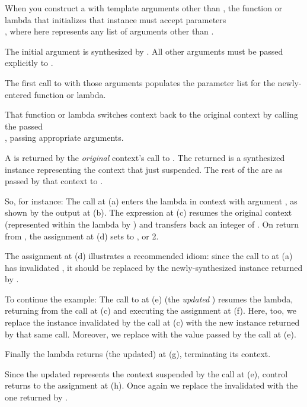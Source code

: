When you construct a \ectx with template arguments other than , the
function or lambda that initializes that instance must accept parameters\\
, where  here
represents any list of arguments other than .

The initial \ectx argument is synthesized by \op. All other arguments must be
passed explicitly to \op.

The first call to \op with those arguments populates the parameter list for
the newly-entered function or lambda.

That function or lambda switches context back to the original context by
calling the passed\\
\ectxop, passing appropriate arguments.

A  is returned by
the \emph{original} context's call to \op. The returned \ectx is a synthesized
instance representing the context that just suspended. The rest of the
 are as passed by that context to \op.

So, for instance:
The  call at (a) enters the lambda in context  with
argument , as shown by the output at (b). The
expression  at (c) resumes the original context (represented
within the lambda by ) and transfers back an integer of .
On return from , the assignment at (d) sets  to ,
or 2.

The assignment at (d) illustrates a recommended idiom: since the call to \op
at (a) has invalidated , it should be replaced by the
newly-synthesized \ectx instance returned by \op.

To continue the example:
The call to  at (e) (the \emph{updated} ) resumes
the  lambda, returning from the  call at (c) and
executing the assignment at (f). Here, too, we replace the \ectx
instance  invalidated by the \op call at (c) with the new instance
returned by that same \op call. Moreover, we replace  with the value
passed by the call at (e).

Finally the lambda returns (the updated)  at (g), terminating its
context.

Since the updated  represents the context suspended by the call at
(e), control returns to the assignment at (h). Once again we replace the
invalidated  with the one returned by \op.

